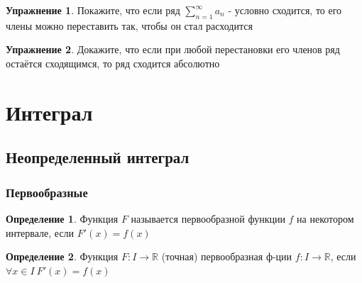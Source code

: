 \documentclass[a4paper]{article}
\newcounter{memories}[subsection]\setcounter{memories}{0}
\renewcommand{\thetheo}{\arabic{subsection}.\arabic{memories}}
\newenvironment{memories}[2][]{%
\refstepcounter{memories}%
\ifstrempty{#1}%
{\mdfsetup{%
frametitle={%
\tikz[baseline=(current bounding box.east),outer sep=0pt]
\node[anchor=east,rectangle,fill=blue!20]
{\strut Воспоминание~\thetheo};}}
}%
{\mdfsetup{%
frametitle={%
\tikz[baseline=(current bounding box.east),outer sep=0pt]
\node[anchor=east,rectangle,fill=blue!20]
{\strut Воспоминание~\thetheo:~#1};}}%
}%
\mdfsetup{innertopmargin=10pt,linecolor=blue!20,%
linewidth=2pt,topline=true,%
frametitleaboveskip=\dimexpr-\ht\strutbox\relax
}
\begin{mdframed}[]\relax%
\label{#2}}{\end{mdframed}}
\theoremstyle{definition}
\newtheorem*{definition*}{Определение}
\newtheorem*{upr}{Упражнение}
\numberwithin{theorem}{subsection}
\numberwithin{lemma}{subsection}
\numberwithin{definition}{subsection}
\numberwithin{comment*}{subsection}
\numberwithin{consequence}{subsection}
\numberwithin{property}{subsection}
\begin{document}
\begin{upr}
 Покажите, что если ряд $\sum_{n=1}^{\infty}{a_n}$ - условно сходится, то его члены можно переставить так, чтобы он стал расходится
\end{upr}
\begin{upr}
 Докажите, что если при любой перестановки его членов ряд остаётся сходящимся, то ряд сходится абсолютно
\end{upr}

\section{Интеграл}
\subsection{Неопределенный интеграл}
\subsubsection{Первообразные}
\begin{definition*}
 Функция $F$ называется первообразной функции $f$ на некотором интервале, если $F'(x) = f(x)$
\end{definition*}

\begin{definition*}
 Функция $F: I \rightarrow \mathbb{R}$ (точная) первообразная ф-ции $f: I \rightarrow \mathbb{R}$, если $\forall{x} \in I \ F'(x) = f(x)$
\end{definition*}
\end{document}
